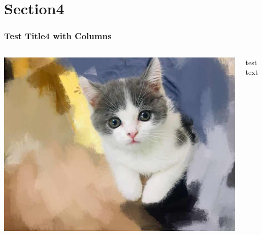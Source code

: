 \documentclass{beamer}
\begin{document}
\section{Section4}

\begin{frame}
    \frametitle{Test Title4 with Columns}

    \begin{columns}


        \includegraphics[height=.85\textheight]{Yugor.jpg}


        test text

    \end{columns}

\end{frame}
\end{document}
